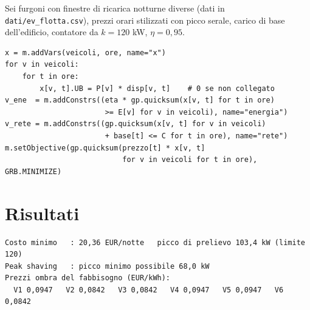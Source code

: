 Sei furgoni con finestre di ricarica notturne diverse (dati in
\texttt{dati/ev\_flotta.csv}), prezzi orari stilizzati con picco serale, carico di
base dell'edificio, contatore da $k = 120$ kW, $\eta = 0{,}95$.

\begin{lstlisting}[style=python]
x = m.addVars(veicoli, ore, name="x")
for v in veicoli:
    for t in ore:
        x[v, t].UB = P[v] * disp[v, t]    # 0 se non collegato
v_ene  = m.addConstrs((eta * gp.quicksum(x[v, t] for t in ore)
                       >= E[v] for v in veicoli), name="energia")
v_rete = m.addConstrs((gp.quicksum(x[v, t] for v in veicoli)
                       + base[t] <= C for t in ore), name="rete")
m.setObjective(gp.quicksum(prezzo[t] * x[v, t]
                           for v in veicoli for t in ore), GRB.MINIMIZE)
\end{lstlisting}

\section{Risultati}

\begin{lstlisting}[style=output]
Costo minimo   : 20,36 EUR/notte   picco di prelievo 103,4 kW (limite 120)
Peak shaving   : picco minimo possibile 68,0 kW
Prezzi ombra del fabbisogno (EUR/kWh):
  V1 0,0947   V2 0,0842   V3 0,0842   V4 0,0947   V5 0,0947   V6 0,0842
\end{lstlisting}

